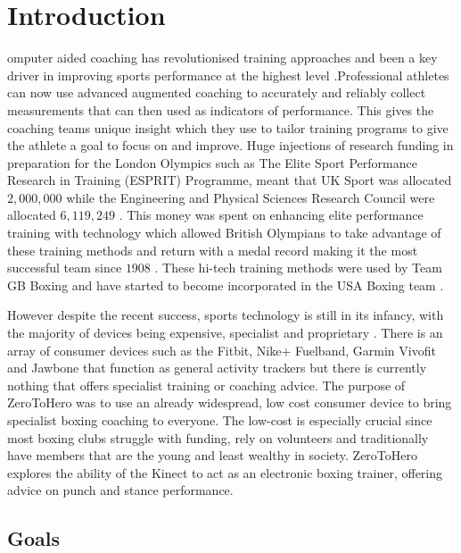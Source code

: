 %
%
\let\textcircled=\pgftextcircled
\chapter{Introduction}
\label{chap:intro}

omputer aided coaching has revolutionised training approaches and been a key driver in improving sports performance at the highest level \cite{ISP}.Professional athletes can now use advanced augmented coaching to accurately and reliably collect measurements that can then used as indicators of performance.\cite{aug0} This gives the coaching teams unique insight which they use to tailor training programs to give the athlete a goal to focus on and improve.
Huge injections of research funding in preparation for the London Olympics such as The Elite Sport Performance Research in Training (ESPRIT) Programme, meant that UK Sport was allocated \textsterling $2,000,000$  while the Engineering and Physical Sciences Research Council were allocated \textsterling $6,119,249$ \cite{EPSRC}\cite{aug5} .  
This money was spent on enhancing elite performance training with technology \cite{aug3} \cite{aug4} which allowed British Olympians to take advantage of these training methods and return with a medal record making it the most successful team since $1908$ \cite{olymp1}. These hi-tech training methods were used by Team GB Boxing \cite{aug2} and have started to become incorporated in the USA Boxing team \cite{aug1}.

However despite the recent success, sports technology is still in its infancy, with the majority of devices being expensive, specialist and proprietary \cite{aug7}. There is an array of consumer devices such as the Fitbit, Nike+ Fuelband, Garmin Vivofit and Jawbone that function as general activity trackers but there is currently nothing that offers specialist training or coaching advice. The purpose of ZeroToHero was to use an already widespread, low cost consumer device to bring specialist boxing coaching to everyone. The low-cost is especially crucial since most boxing clubs struggle with funding, rely on volunteers and traditionally have members that are the young and least wealthy in society. ZeroToHero explores the ability of the Kinect to act as an electronic boxing trainer, offering advice on punch and stance performance.
\section{Goals}
\label{sec:sec01}

